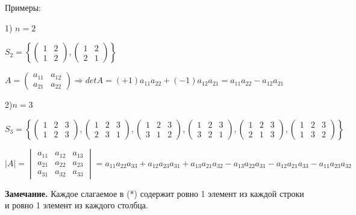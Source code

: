 \vspace{\baselineskip}
Примеры: 

1) $n = 2$ 

$S_2 = \left\{ \begin{pmatrix} 1 & 2 \\ 1 & 2 \end{pmatrix}, \begin{pmatrix} 1 & 2 \\ 2 & 1 \end{pmatrix} \right\}$

$A = \begin{pmatrix} a_{11} & a_{12} \\ a_{21} & a_{22} \end{pmatrix} \Rightarrow detA = (+1) a_{11} a_{22} + (-1) a_{12} a_{21} = a_{11} a_{22} - a_{12} a_{21}$

\vspace{\baselineskip}
2)$n = 3$

$S_3 = \left\{ 
\begin{pmatrix} 1 & 2 & 3 \\ 1 & 2 & 3 \end{pmatrix}, 
\begin{pmatrix} 1 & 2 & 3 \\ 2 & 3 & 1 \end{pmatrix}, 
\begin{pmatrix} 1 & 2 & 3 \\ 3 & 1 & 2 \end{pmatrix}, 
\begin{pmatrix} 1 & 2 & 3 \\ 3 & 2 & 1 \end{pmatrix}, 
\begin{pmatrix} 1 & 2 & 3 \\ 2 & 1 & 3 \end{pmatrix}, 
\begin{pmatrix} 1 & 2 & 3 \\ 1 & 3 & 2 \end{pmatrix} \right\}$

$|A| = \begin{vmatrix} a_{11} & a_{12} & a_{13} \\ a_{21} & a_{22} & a_{23} \\ a_{31} & a_{32} & a_{33} \end{vmatrix} = a_{11} a_{22} a_{33} + a_{12} a_{23} a_{31} + a_{13} a_{21} a_{32} - a_{13} a_{22} a_{31} - a_{12} a_{21} a_{33} - a_{11} a_{23} a_{32} $

\vspace{\baselineskip}
\textbf{Замечание.} Каждое слагаемое в (*) содержит ровно 1 элемент из каждой строки и ровно 1 элемент из каждого столбца.

